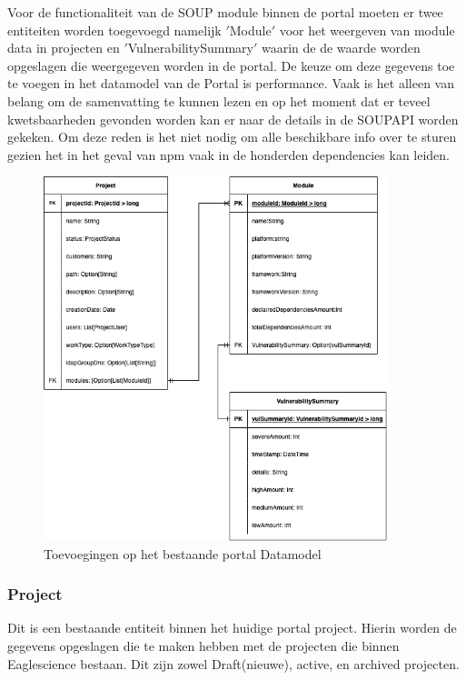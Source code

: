 Voor de functionaliteit van de SOUP module binnen de portal moeten er twee entiteiten worden toegevoegd namelijk $'$Module$'$ voor het weergeven van module data in projecten en $'$VulnerabilitySummary$'$ waarin de de waarde worden opgeslagen die weergegeven worden in de portal. De keuze om deze gegevens toe te voegen in het datamodel van de Portal is performance. Vaak is het alleen van belang om de samenvatting te kunnen lezen en op het moment dat er teveel kwetsbaarheden gevonden worden kan er naar de details in de SOUPAPI worden gekeken. Om deze reden is het niet nodig om alle beschikbare info over te sturen gezien het in het geval van npm vaak in de honderden dependencies kan leiden.


\begin{figure}[bth]
    \myfloatalign
    \includegraphics[width=10cm]{gfx/SOUPAPI-PortalDM}
    \caption{Toevoegingen op het bestaande portal Datamodel}
    \label{fig:SOUP-portalDm}
\end{figure}

\subsubsection{Project}\label{subsubsec:portalProject}
Dit is een bestaande entiteit binnen het huidige portal project. Hierin worden de gegevens opgeslagen die te maken hebben met de projecten die binnen Eaglescience bestaan. Dit zijn zowel Draft(nieuwe), active, en archived projecten.

